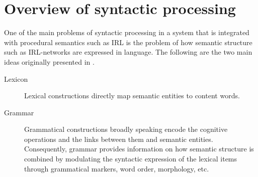 \section{Overview of syntactic processing}
\label{s:syntactic-processing-overview}
One of the main problems of syntactic processing in a system that
is integrated with procedural semantics such as IRL is the problem
of how semantic structure such as IRL-networks are expressed
in language. The following are the two main ideas originally presented
in \citet{steels2005planning}.
\begin{description}
\item[Lexicon] Lexical constructions directly map semantic entities 
to content words.
\item[Grammar] Grammatical constructions broadly speaking encode
the cognitive operations and the links between them and 
semantic entities. Consequently, grammar 
provides information on how semantic structure is combined \citep{steels2011phrasal}
by modulating the syntactic expression of the lexical items through
grammatical markers, word order, morphology, etc. 
\end{description}

